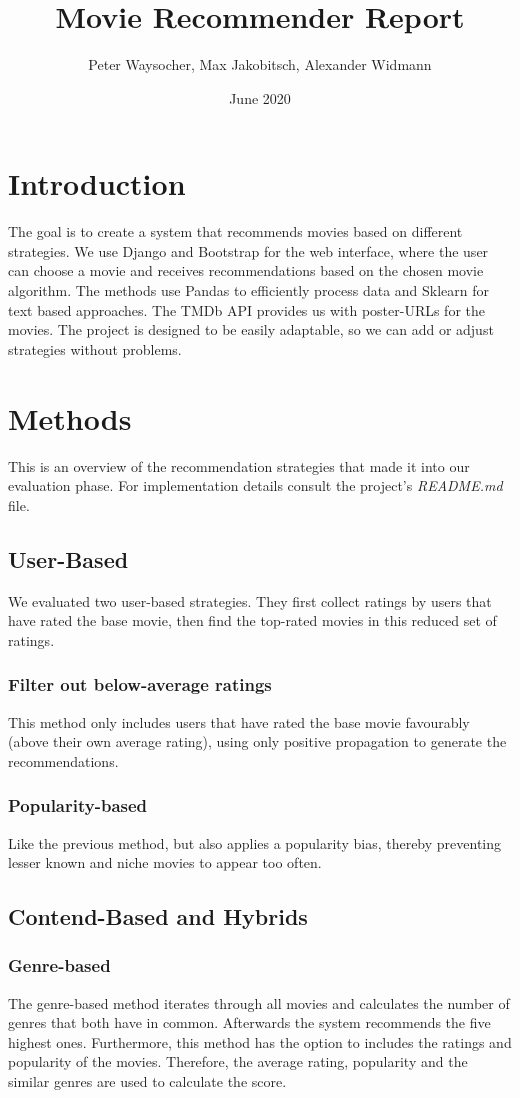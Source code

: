 \documentclass{article}
\title{Movie Recommender Report}
\author{Peter Waysocher, Max Jakobitsch, Alexander Widmann}
\date{June 2020}
\begin{document}
\maketitle

\section{Introduction}
The goal is to create a system that recommends movies based on different strategies. We use Django and Bootstrap for the web interface, where the user can choose a movie and receives recommendations based on the chosen movie algorithm. The methods use Pandas to efficiently process data and Sklearn for text based approaches. The TMDb API provides us with poster-URLs for the movies. The project is designed to be easily adaptable, so we can add or adjust strategies without problems.

\section{Methods}
This is an overview of the recommendation strategies that made it into our evaluation phase. For implementation details consult the project's \emph{README.md} file.

\subsection{User-Based}
We evaluated two user-based strategies. They first collect ratings by users that have rated the base movie, then find the top-rated movies in this reduced set of ratings.
\subsubsection{Filter out below-average ratings}
This method only includes users that have rated the base movie favourably (above their own average rating), using only positive propagation to generate the recommendations.
\subsubsection{Popularity-based}
Like the previous method, but also applies a popularity bias, thereby preventing lesser known and niche movies to appear too often.
\subsection{Contend-Based and Hybrids}
\subsubsection{Genre-based}
The genre-based method iterates through all movies and calculates the number of genres that both have in common. Afterwards the system recommends the five highest ones. Furthermore, this method has the option to includes the ratings and popularity of the movies. Therefore, the average rating, popularity and the similar genres are used to calculate the score.
\end{document}
